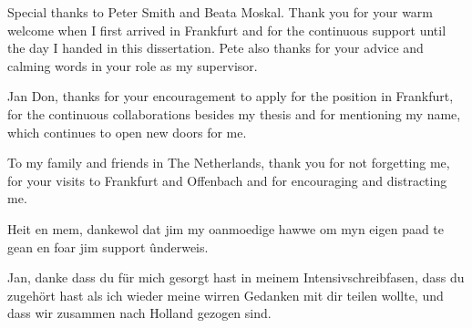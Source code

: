 Special thanks to Peter Smith and Beata Moskal.
Thank you for your warm welcome when I first arrived in Frankfurt and for the continuous support until the day I handed in this dissertation.
Pete also thanks for your advice and calming words in your role as my supervisor.

Jan Don, thanks for your encouragement to apply for the position in Frankfurt, for the continuous collaborations besides my thesis and for mentioning my name, which continues to open new doors for me.

To my family and friends in The Netherlands, thank you for not forgetting me, for your visits to Frankfurt and Offenbach and for encouraging and distracting me.

Heit en mem, dankewol dat jim my oanmoedige hawwe om myn eigen paad te gean en foar jim support ûnderweis.

Jan, danke dass du für mich gesorgt hast in meinem Intensivschreibfasen, dass du zugehört hast als ich wieder meine wirren Gedanken mit dir teilen wollte, und dass wir zusammen nach Holland gezogen sind.
